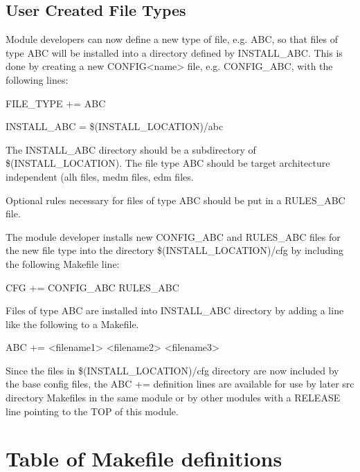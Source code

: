 \subsection{User Created File Types}

Module developers can now define a new type of file, e.g. ABC, so that files of type ABC will be installed into a directory 
defined by INSTALL\_ABC. This is done by creating a new CONFIG\textless{}name\textgreater{} file, e.g. CONFIG\_ABC, with the 
following lines:

\begin{description}\item {}FILE\_TYPE += ABC

\item INSTALL\_ABC = \$(INSTALL\_LOCATION)/abc

\end{description}The INSTALL\_ABC directory should be a subdirectory of \$(INSTALL\_LOCATION). The file type ABC should be 
target architecture independent (alh files, medm files, edm files.

Optional rules necessary for files of type ABC should be put in a RULES\_ABC file.

The module developer installs new CONFIG\_ABC and RULES\_ABC files for the new file type into the directory 
\$(INSTALL\_LOCATION)/cfg by including the following Makefile line:

\begin{description}\item       {}CFG += CONFIG\_ABC RULES\_ABC

\end{description}Files of type ABC are installed into INSTALL\_ABC directory by adding a line like the following to a Makefile.

\begin{description}\item       ABC += \textless{}filename1\textgreater{} \textless{}filename2\textgreater{} \textless{}filename3\textgreater{}

\end{description}Since the files in \$(INSTALL\_LOCATION)/cfg directory are now included by the base config files, the ABC += 
definition lines are available for use by later src directory Makefiles in the same module or by other modules with a 
RELEASE line pointing to the TOP of this module.

\section{Table of Makefile definitions}

